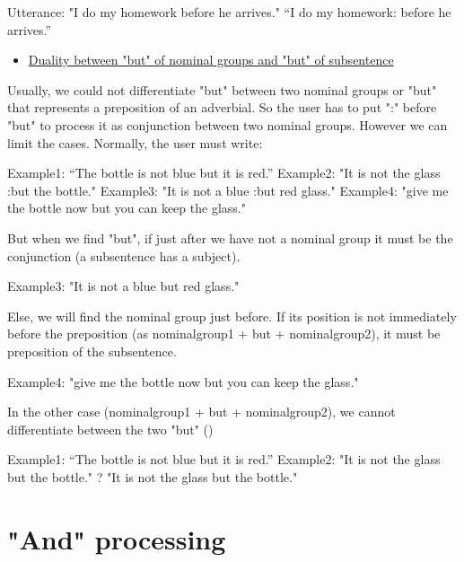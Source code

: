 \documentclass[twoside,a4paper,10pt]{report}
\newcommand{\dokutitleleveltree}[1]{\section{#1}}
\newcommand{\dokuunderline}[1]{\underline{#1}}
\newcommand{\dokuitem}{\item}
\begin{document}
\small
\begin{verbatimtab}
  Utterance: "I do my homework before he arrives."
  “I do my homework: before he arrives.”
\end{verbatimtab}
\normalsize

\begin{itemize}
\dokuitem  \dokuunderline{Duality between "but" of nominal groups and "but" of subsentence}
\end{itemize}
Usually, we could not differentiate "but" between two nominal groups or "but" that represents a preposition of an adverbial. So the user has to put ":" before "but" to process it as conjunction between two nominal groups. However we can limit the cases. Normally, the user must write:


\small
\begin{verbatimtab}
  Example1: “The bottle is not blue but it is red.” 
  Example2: "It is not the glass :but the bottle."
  Example3: "It is not a blue :but red glass."
  Example4: "give me the bottle now but you can keep the glass."
\end{verbatimtab}
\normalsize
But when we find "but", if just after we have not a nominal group it must be the conjunction (a subsentence has a subject). 


\small
\begin{verbatimtab}
  Example3: "It is not a blue but red glass."
\end{verbatimtab}
\normalsize
Else, we will find the nominal group just before. If its position is not immediately before the preposition (as nominal{\textunderscore}group1 + but + nominal{\textunderscore}group2), it must be preposition of the subsentence.


\small
\begin{verbatimtab}
  Example4: "give me the bottle now but you can keep the glass."
\end{verbatimtab}
\normalsize
In the other case (nominal{\textunderscore}group1 + but + nominal{\textunderscore}group2), we cannot differentiate between the two "but" ()


\small
\begin{verbatimtab}
  Example1: “The bottle is not blue but it is red.” 
  Example2: "It is not the glass but the bottle." ? "It is not the glass but the bottle."
\end{verbatimtab}
\normalsize

\dokutitleleveltree{"And" processing}
\label{3dd83b6ed393cdcc2a450375a4147efc}%
\end{document}
